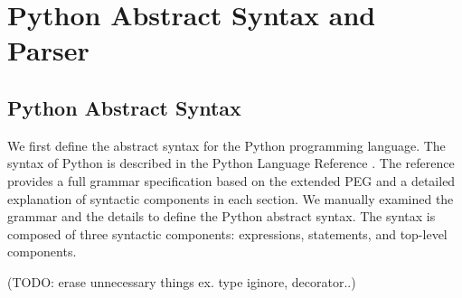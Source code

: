 \section{Python Abstract Syntax and Parser}\label{sec:pysyn}
\subsection{Python Abstract Syntax}

We first define the abstract syntax for the Python programming language.
The syntax of Python is described in the Python Language Reference \cite{pythonref}.
The reference provides a full grammar specification based on the extended PEG
and a detailed explanation of syntactic components in each section.
We manually examined the grammar and the details
to define the Python abstract syntax.
The syntax is composed of three syntactic components: expressions, statements,
and top-level components.

(TODO: erase unnecessary things ex. type iginore, decorator..)

